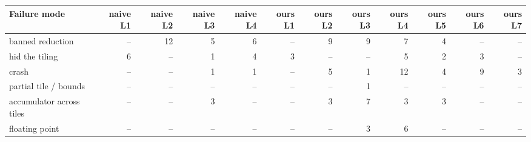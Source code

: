 \begin{tabular}{@{}lrrrrrrrrrrr@{}}
\toprule
Failure mode & naive L1 & naive L2 & naive L3 & naive L4 & ours L1 & ours L2 & ours L3 & ours L4 & ours L5 & ours L6 & ours L7 \\
\midrule
banned reduction & -- & 12 & 5 & 6 & -- & 9 & 9 & 7 & 4 & -- & -- \\
hid the tiling & 6 & -- & 1 & 4 & 3 & -- & -- & 5 & 2 & 3 & -- \\
crash & -- & -- & 1 & 1 & -- & 5 & 1 & 12 & 4 & 9 & 3 \\
partial tile / bounds & -- & -- & -- & -- & -- & -- & 1 & -- & -- & -- & -- \\
accumulator across tiles & -- & -- & 3 & -- & -- & 3 & 7 & 3 & 3 & -- & -- \\
floating point & -- & -- & -- & -- & -- & -- & 3 & 6 & -- & -- & -- \\
\bottomrule
\end{tabular}
